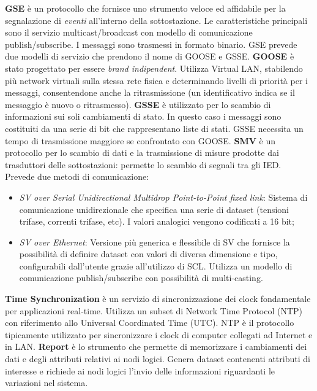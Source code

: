 \textbf{GSE} è un protocollo che fornisce uno strumento veloce ed affidabile per la segnalazione di \emph{eventi} all'interno della sottostazione. Le caratteristiche principali sono il servizio multicast/broadcast con modello di comunicazione publish/subscribe. I messaggi sono trasmessi in formato binario. GSE prevede due modelli di servizio che prendono il nome di GOOSE e GSSE.\newline\newline
\textbf{GOOSE} è stato progettato per essere \emph{brand indipendent}. Utilizza Virtual LAN, stabilendo più network virtuali sulla stessa rete fisica e determinando livelli di priorità per i messaggi, consentendone anche la ritrasmissione (un identificativo indica se il messaggio è nuovo o ritrasmesso).\newpage
\textbf{GSSE} è utilizzato per lo scambio di informazioni sui soli cambiamenti di stato. In questo caso i messaggi sono costituiti da una serie di bit che rappresentano liste di stati. GSSE necessita un tempo di trasmissione maggiore se confrontato con GOOSE.
\newline\newline
\textbf{SMV} è un protocollo per lo scambio di dati e la trasmissione di misure prodotte dai trasduttori delle sottostazioni: permette lo scambio di segnali tra gli IED. Prevede due metodi di comunicazione:
\begin{itemize}
	\item\emph{SV over Serial Unidirectional Multidrop Point-to-Point fixed link}: Sistema di comunicazione unidirezionale che specifica una serie di dataset (tensioni trifase, correnti trifase, etc). I valori analogici vengono codificati a 16 bit;
	\item\emph{SV over Ethernet}: Versione più generica e flessibile di SV che fornisce la possibilità di definire dataset con valori di diversa dimensione e tipo, configurabili dall'utente grazie all'utilizzo di SCL. Utilizza un modello di comunicazione publish/subscribe con possibilità di multi-casting.
\end{itemize}
\textbf{Time Synchronization} è un servizio di sincronizzazione dei clock fondamentale per applicazioni real-time. Utilizza un subset di Network Time Protocol (NTP) con riferimento allo Universal Coordinated Time (UTC). NTP è il protocollo tipicamente utilizzato per sincronizzare i clock di computer collegati ad Internet e in LAN.\newline\newline
\textbf{Report} è lo strumento che permette di memorizzare i cambiamenti dei dati e degli attributi relativi ai nodi logici. Genera dataset contenenti attributi di interesse e richiede ai nodi logici l'invio delle informazioni riguardanti le variazioni nel sistema.\newline\newline
